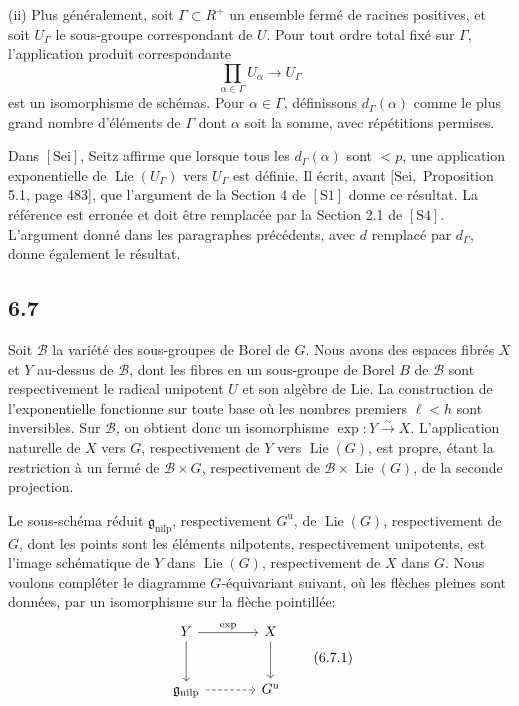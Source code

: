 \documentclass[11pt]{article}
\newcommand{\Lie}{\operatorname{Lie}}
\newcommand{\nilp}{\mathrm{nilp}}
\newcommand{\unip}{\mathrm u}
\begin{document}
(ii) Plus généralement, soit \(\Gamma\subset R^+\) un ensemble fermé de racines positives, et soit
\(U_\Gamma\) le sous-groupe correspondant de \(U\). Pour tout ordre total fixé sur \(\Gamma\),
l'application produit correspondante
\begin{equation}
  \prod_{\alpha\in\Gamma}U_\alpha\longrightarrow U_\Gamma
  \tag{6.6.2}
\end{equation}
est un isomorphisme de schémas. Pour \(\alpha\in\Gamma\), définissons \(d_\Gamma(\alpha)\) comme le
plus grand nombre d'éléments de \(\Gamma\) dont \(\alpha\) soit la somme, avec répétitions permises.

Dans \([\mathrm{Sei}]\), Seitz affirme que lorsque tous les \(d_\Gamma(\alpha)\) sont \(<p\), une
application exponentielle de \(\Lie(U_\Gamma)\) vers \(U_\Gamma\) est définie. Il écrit, avant
\([\mathrm{Sei},\) Proposition 5.1, page 483], que l'argument de la Section 4 de \([\mathrm{S1}]\)
donne ce résultat. La référence est erronée et doit être remplacée par la Section 2.1 de
\([\mathrm{S4}]\). L'argument donné dans les paragraphes précédents, avec \(d\) remplacé par
\(d_\Gamma\), donne également le résultat.

\subsection*{6.7}
Soit \(\mathcal B\) la variété des sous-groupes de Borel de \(G\). Nous avons des espaces fibrés
\(X\) et \(Y\) au-dessus de \(\mathcal B\), dont les fibres en un sous-groupe de Borel \(B\) de
\(\mathcal B\) sont respectivement le radical unipotent \(U\) et son algèbre de Lie. La construction
de l'exponentielle fonctionne sur toute base où les nombres premiers \(\ell<h\) sont inversibles. Sur
\(\mathcal B\), on obtient donc un isomorphisme \(\exp:Y\xrightarrow{\sim}X\). L'application
naturelle de \(X\) vers \(G\), respectivement de \(Y\) vers \(\Lie(G)\), est propre, étant la restriction
à un fermé de \(\mathcal B\times G\), respectivement de \(\mathcal B\times\Lie(G)\), de la seconde
projection.

Le sous-schéma réduit \(\mathfrak g_{\nilp}\), respectivement \(G^{\unip}\), de \(\Lie(G)\),
respectivement de \(G\), dont les points sont les éléments nilpotents, respectivement unipotents,
est l'image schématique de \(Y\) dans \(\Lie(G)\), respectivement de \(X\) dans \(G\). Nous voulons
compléter le diagramme \(G\)-équivariant suivant, où les flèches pleines sont données, par un
isomorphisme sur la flèche pointillée:
\begin{equation}
\begin{tikzcd}[column sep=large,row sep=large]
  Y \arrow[r,"\exp"] \arrow[d] & X \arrow[d] \\
  \mathfrak g_{\nilp} \arrow[r,dashed] & G^{\unip}
\end{tikzcd}
\tag{6.7.1}
\end{equation}
\end{document}
